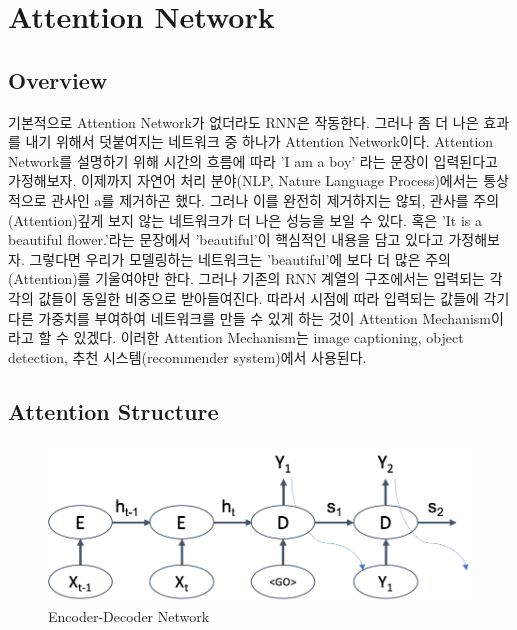 \documentclass[draft=false]{oblivoir}
\begin{document}
\section{Attention Network}

\subsection{Overview}
기본적으로 Attention Network가 없더라도 RNN은 작동한다. 그러나 좀 더 나은 효과를 내기 위해서 덧붙여지는 네트워크 중 하나가 Attention Network이다. Attention Network를 설명하기 위해 시간의 흐름에 따라 'I am a boy' 라는 문장이 입력된다고 가정해보자. 이제까지 자연어 처리 분야(NLP, Nature Language Process)에서는 통상적으로 관사인 a를 제거하곤 했다. 그러나 이를 완전히 제거하지는 않되, 관사를 주의(Attention)깊게 보지 않는 네트워크가 더 나은 성능을 보일 수 있다. 혹은 'It is a beautiful flower.'라는 문장에서 'beautiful'이 핵심적인 내용을 담고 있다고 가정해보자. 그렇다면 우리가 모델링하는 네트워크는 'beautiful'에 보다 더 많은 주의(Attention)를 기울여야만 한다. 그러나 기존의 RNN 계열의 구조에서는 입력되는 각각의 값들이 동일한 비중으로 받아들여진다. 따라서 시점에 따라 입력되는 값들에 각기 다른 가중치를 부여하여 네트워크를 만들 수 있게 하는 것이 Attention Mechanism이라고 할 수 있겠다. 이러한 Attention Mechanism는 image captioning, object detection, 추천 시스템(recommender system)에서 사용된다. 

\subsection{Attention Structure}

\begin{figure}[ht] \centering 
  \includegraphics[scale=0.6]{fig20.png} 
  \caption{Encoder-Decoder Network}
  \label{fig:16-20}
\end{figure}
\end{document}

